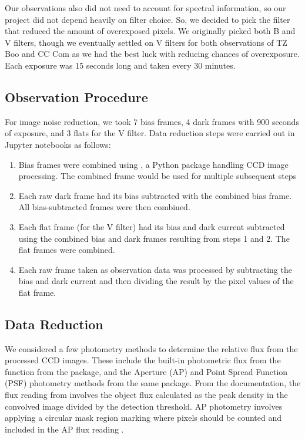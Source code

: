\documentclass[12pt]{article}
\begin{document}
Our observations also did not need to account for spectral information, so our project did not depend heavily on filter choice. So, we decided to pick the filter that reduced the amount of overexposed pixels. We originally picked both B and V filters, though we eventually settled on V filters for both observations of TZ Boo and CC Com as we had the best luck with reducing chances of overexposure. Each exposure was 15 seconds long and taken every 30 minutes.

\subsection{Observation Procedure}
For image noise reduction, we took 7 bias frames, 4 dark frames with 900 seconds of exposure, and 3 flats for the V filter. Data reduction steps were carried out in Jupyter notebooks as follows:

\begin{enumerate}
    \item Bias frames were combined using , a Python package handling CCD image processing. The combined frame would be used for multiple subsequent steps
    \item Each raw dark frame had its bias subtracted with the combined bias frame. All bias-subtracted frames were then combined.
    \item Each flat frame (for the V filter) had its bias and dark current subtracted using the combined bias and dark frames resulting from steps 1 and 2. The flat frames were combined.
    \item Each raw frame taken as observation data was processed by subtracting the bias and dark current and then dividing the result by the pixel values of the flat frame. 
\end{enumerate}

\subsection{Data Reduction}
We considered a few photometry methods to determine the relative flux from the processed CCD images. These include the built-in photometric flux from the  function from the  package, and the Aperture (AP) and Point Spread Function (PSF) photometry methods from the same  package. From the  documentation, the flux reading from  involves the object flux calculated as the peak density in the convolved image divided by the detection threshold. AP photometry involves applying a circular mask region marking where pixels should be counted and included in the AP flux reading \cite{Craig_2021}. 
\end{document}
